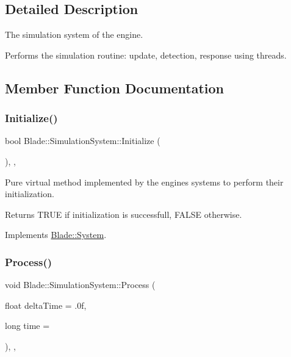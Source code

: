 \subsection{Detailed Description}
The simulation system of the engine. 

Performs the simulation routine\+: update, detection, response using threads. 

\subsection{Member Function Documentation}
\mbox{\label{class_blade_1_1_simulation_system_a44ca3c7941497162d70f1e9e53b016f9}} 
\subsubsection{\texorpdfstring{Initialize()}{Initialize()}}
{\footnotesize\ttfamily bool Blade\+::\+Simulation\+System\+::\+Initialize (\begin{DoxyParamCaption}{ }\end{DoxyParamCaption})\hspace{0.3cm}{\ttfamily [override]}, {\ttfamily [virtual]}, {\ttfamily [noexcept]}}



Pure virtual method implemented by the engine\textquotesingle{}s systems to perform their initialization. 

\begin{DoxyReturn}{Returns}
T\+R\+UE if initialization is successfull, F\+A\+L\+SE otherwise. 
\end{DoxyReturn}


Implements \hyperlink{class_blade_1_1_system_a63fa00af40dc54d093300eff4785f26f}{Blade\+::\+System}.

\mbox{\label{class_blade_1_1_simulation_system_ade81487a31325272e8489c772530ccf5}} 
\subsubsection{\texorpdfstring{Process()}{Process()}}
{\footnotesize\ttfamily void Blade\+::\+Simulation\+System\+::\+Process (\begin{DoxyParamCaption}\item[{float}]{delta\+Time = {\ttfamily .0f},  }\item[{long}]{time = {} }\end{DoxyParamCaption})\hspace{0.3cm}{\ttfamily [override]}, {\ttfamily [virtual]}, {\ttfamily [noexcept]}}



